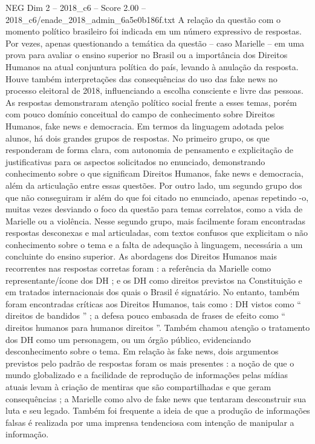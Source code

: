 \begin{textsample}{NEG Dim 2 – 2018\_c6 – Score 2.00 – 2018\_c6/enade\_2018\_admin\_6a5e0b186f.txt}
A relação da questão com o momento político brasileiro foi indicada em um número expressivo de respostas.
Por vezes, apenas questionando a temática da questão – caso Marielle – em uma prova para avaliar o ensino superior no Brasil ou a importância dos Direitos Humanos na atual conjuntura política do país, levando à anulação da resposta.
Houve também interpretações das consequências do uso das fake news no processo eleitoral de 2018, influenciando a escolha consciente e livre das pessoas.
As respostas demonstraram atenção político social frente a esses temas, porém com pouco domínio conceitual do campo de conhecimento sobre Direitos Humanos, fake news e democracia.
Em termos da linguagem adotada pelos alunos, há dois grandes grupos de respostas.
No primeiro grupo, os que responderam de forma clara, com autonomia de pensamento e explicitação de justificativas para os aspectos solicitados no enunciado, demonstrando conhecimento sobre o que significam Direitos Humanos, fake news e democracia, além da articulação entre essas questões.
Por outro lado, um segundo grupo dos que não conseguiram ir além do que foi citado no enunciado, apenas repetindo -o, muitas vezes desviando o foco da questão para temas correlatos, como a vida de Marielle ou a violência.
Nesse segundo grupo, mais facilmente foram encontradas respostas desconexas e mal articuladas, com textos confusos que explicitam o não conhecimento sobre o tema e a falta de adequação à linguagem, necessária a um concluinte do ensino superior.
As abordagens dos Direitos Humanos mais recorrentes nas respostas corretas foram : a referência da Marielle como representante/ícone dos DH ; e os DH como direitos previstos na Constituição e em tratados internacionais dos quais o Brasil é signatário.
No entanto, também foram encontradas críticas aos Direitos Humanos, tais como : DH vistos como “ direitos de bandidos ” ; a defesa pouco embasada de frases de efeito como “ direitos humanos para humanos direitos ”.
Também chamou atenção o tratamento dos DH como um personagem, ou um órgão público, evidenciando desconhecimento sobre o tema.
Em relação às fake news, dois argumentos previstos pelo padrão de respostas foram os mais presentes : a noção de que o mundo globalizado e a facilidade de reprodução de informações pelas mídias atuais levam à criação de mentiras que são compartilhadas e que geram consequências ; a Marielle como alvo de fake news que tentaram desconstruir sua luta e seu legado.
Também foi frequente a ideia de que a produção de informações falsas é realizada por uma imprensa tendenciosa com intenção de manipular a informação.

\end{textsample}
